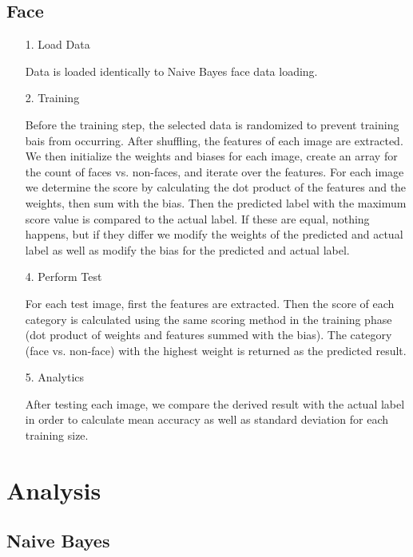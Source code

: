 \documentclass[12pt]{article}
\begin{document}
\subsection{Face}
\begin{itemize}
    \item[1.] Load Data
    \item[] Data is loaded identically to Naive Bayes face data loading.
    \item[2.] Training 
    \item[] Before the training step, the selected data is randomized to prevent training bais from occurring. After shuffling, the features of each image are extracted. We then initialize the weights and biases for each image, create an array for the count of faces vs. non-faces, and iterate over the features. For each image we determine the score by calculating the dot product of the features and the weights, then sum with the bias. Then the predicted label with the maximum score value is compared to the actual label. If these are equal, nothing happens, but if they differ we modify the weights of the predicted and actual label as well as modify the bias for the predicted and actual label.
    \item[4.] Perform Test
    \item[] For each test image, first the features are extracted. Then the score of each category is calculated using the same scoring method in the training phase (dot product of weights and features summed with the bias). The category (face vs. non-face) with the highest weight is returned as the predicted result.
    \item[5.] Analytics
    \item[] After testing each image, we compare the derived result with the actual label in order to calculate mean accuracy as well as standard deviation for each training size. 
\end{itemize}


\section{Analysis}
\subsection{Naive Bayes}
\end{document}
